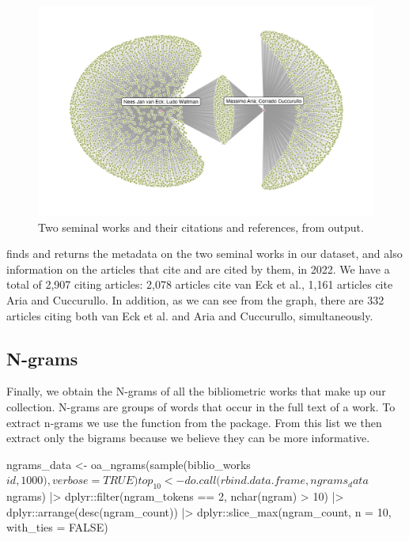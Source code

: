 \begin{figure}[htbp]
  \centering
  \includegraphics[scale=0.72]{figures/citation-graph}
  \caption{Two seminal works and their citations and references, from  output.}
  \label{citation_graph}
\end{figure}



 finds and returns the metadata on the two seminal works in our dataset, and also information on the articles that cite and are cited by them, in 2022. We have a total of 2,907 citing articles: 2,078 articles cite van Eck et al., 1,161 articles cite Aria and Cuccurullo. In addition, as we can see from the graph, there are 332 articles citing both van Eck et al. and Aria and Cuccurullo, simultaneously.


\subsection{N-grams}

Finally, we obtain the N-grams of all the bibliometric works that make up our collection. N-grams are groups of words that occur in the full text of a work. To extract n-grams we use the  function from the  package. From this list we then extract only the bigrams because we believe they can be more informative.

\begin{example}
ngrams_data <- oa_ngrams(sample(biblio_works$id, 1000), verbose = TRUE)
top_10 <- do.call(rbind.data.frame, ngrams_data$ngrams) |>
  dplyr::filter(ngram_tokens == 2, nchar(ngram) > 10) |>
  dplyr::arrange(desc(ngram_count)) |>
  dplyr::slice_max(ngram_count, n = 10, with_ties = FALSE)
\end{example}

